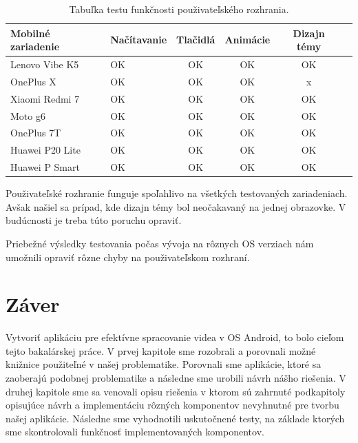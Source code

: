 \documentclass[12pt, oneside]{book}
\begin{document}
\begin{table}[H]

\begin{center}
\begin{tabularx}{\textwidth}{
| >{\centering\arraybackslash}X
| >{\centering\arraybackslash}X
| >{\centering\arraybackslash}c
| >{\centering\arraybackslash}c
| >{\centering\arraybackslash}c
| >{\centering\arraybackslash}c|} 
  \hline
 \textbf{Mobilné zariadenie}  & \textbf{Načítavanie} & \textbf{Tlačidlá} & \textbf{Animácie} & \textbf{Dizajn témy} \\
 \hline
Lenovo Vibe K5 & OK & OK & OK & OK \\
 \hline
  OnePlus X & OK & OK & OK & x \\
 \hline
 Xiaomi Redmi 7 & OK & OK & OK & OK \\
 \hline
 Moto g6 &  OK & OK & OK & OK \\
 \hline
OnePlus 7T &  OK & OK & OK & OK \\
 \hline
 Huawei P20 Lite &  OK & OK & OK & OK \\
 \hline
 Huawei P Smart &  OK & OK & OK & OK  \\
 \hline

\end{tabularx}

\caption{Tabuľka testu funkčnosti použivateľského rozhrania. }
\end{center}
\end{table}

Použivateľské rozhranie funguje spoľahlivo na všetkých testovaných zariadeniach. Avšak našiel sa prípad, kde dizajn témy bol neočakavaný na jednej obrazovke. V budúcnosti je treba túto poruchu opraviť. 

Priebežné výsledky testovania počas vývoja na rôznych OS verziach nám umožnili opraviť rôzne chyby na použivateľskom rozhraní.

\newpage

\chapter*{Záver}

\hspace{15pt} Vytvoriť aplikáciu pre efektívne spracovanie videa v OS Android, to bolo cieľom tejto bakalárskej práce. V prvej kapitole sme rozobrali a porovnali možné knižnice použiteľné v našej problematike. Porovnali sme aplikácie, ktoré sa zaoberajú podobnej problematike a následne sme urobili návrh nášho riešenia. V druhej kapitole sme sa venovali opisu riešenia v ktorom sú zahrnuté podkapitoly opisujúce návrh a implementáciu rôzných komponentov nevyhnutné pre tvorbu našej aplikácie. Následne sme vyhodnotili uskutočnené testy, na základe ktorých sme skontrolovali funkčnosť implementovaných komponentov.
\end{document}
